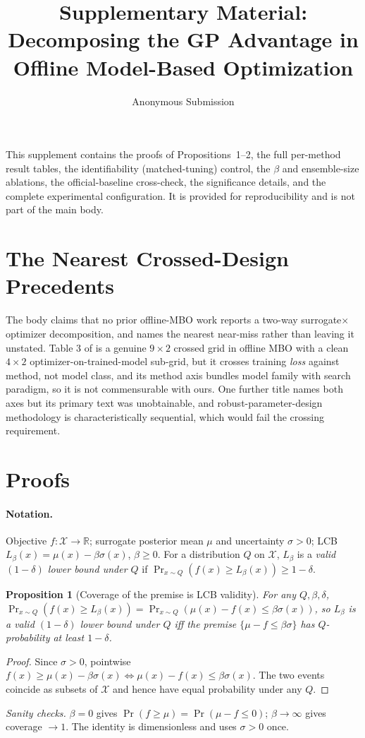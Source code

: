 \documentclass[letterpaper]{article}
\title{Supplementary Material:\\Decomposing the GP Advantage in Offline Model-Based Optimization}
\author{Anonymous Submission}
\theoremstyle{plain}
\newtheorem{proposition}{Proposition}
\newcommand{\X}{\mathcal{X}}
\begin{document}
\maketitle

This supplement contains the proofs of Propositions~1--2, the full per-method result tables, the identifiability (matched-tuning) control, the $\beta$ and ensemble-size ablations, the official-baseline cross-check, the significance details, and the complete experimental configuration. It is provided for reproducibility and is not part of the main body.

\section{The Nearest Crossed-Design Precedents}
The body claims that no prior offline-MBO work reports a two-way surrogate$\times$optimizer decomposition, and names the nearest near-miss rather than leaving it unstated. Table 3 of \citet{tan2025ltr} is a genuine $9\times2$ crossed grid in offline MBO with a clean $4\times2$ optimizer-on-trained-model sub-grid, but it crosses training \emph{loss} against method, not model class, and its method axis bundles model family with search paradigm, so it is not commensurable with ours. One further title names both axes \citep{elsayed2014robust} but its primary text was unobtainable, and robust-parameter-design methodology is characteristically sequential, which would fail the crossing requirement.

\section{Proofs}

\paragraph{Notation.} Objective $f:\X\to\mathbb{R}$; surrogate posterior mean $\mu$ and uncertainty $\sigma>0$; LCB $L_\beta(x)=\mu(x)-\beta\sigma(x)$, $\beta\ge0$. For a distribution $Q$ on $\X$, $L_\beta$ is a \emph{valid $(1{-}\delta)$ lower bound under $Q$} if $\Pr_{x\sim Q}(f(x)\ge L_\beta(x))\ge 1{-}\delta$.

\begin{proposition}[Coverage of the premise is LCB validity]
For any $Q,\beta,\delta$,
$\Pr_{x\sim Q}(f(x)\ge L_\beta(x))=\Pr_{x\sim Q}(\mu(x)-f(x)\le\beta\sigma(x))$,
so $L_\beta$ is a valid $(1{-}\delta)$ lower bound under $Q$ iff the premise $\{\mu-f\le\beta\sigma\}$ has $Q$-probability at least $1{-}\delta$.
\end{proposition}
\begin{proof}
Since $\sigma>0$, pointwise $f(x)\ge\mu(x)-\beta\sigma(x)\iff\mu(x)-f(x)\le\beta\sigma(x)$. The two events coincide as subsets of $\X$ and hence have equal probability under any $Q$.
\end{proof}
\noindent\emph{Sanity checks.} $\beta{=}0$ gives $\Pr(f\ge\mu)=\Pr(\mu-f\le0)$; $\beta\to\infty$ gives coverage $\to1$. The identity is dimensionless and uses $\sigma>0$ once.
\end{document}
